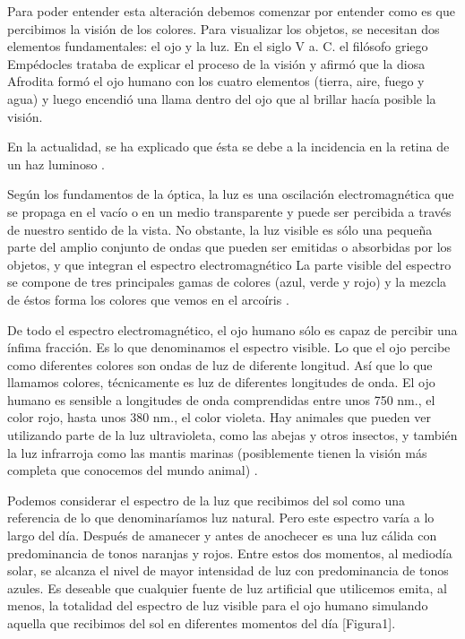 \documentclass[10pt]{article}
\begin{document}
\setlength{\parskip}{2mm}

Para poder entender esta alteración debemos comenzar por entender como es que percibimos la visión de los colores.
Para visualizar los objetos, se necesitan dos elementos fundamentales: el ojo y la luz. En el siglo V a. C. el filósofo griego Empédocles trataba de explicar el proceso de la visión y afirmó que la diosa Afrodita formó el ojo humano con los cuatro elementos (tierra, aire, fuego y agua) y luego encendió una llama dentro del ojo que al brillar hacía posible la visión.

\setlength{\parskip}{2mm}

En la actualidad, se ha explicado que ésta se debe a la incidencia en la retina de un haz luminoso \cite{IEEEreferencias:Ref13}.

\setlength{\parskip}{2mm}

Según los fundamentos de la óptica, la luz es una oscilación electromagnética que se propaga en el vacío o en un medio transparente y puede ser percibida a través de nuestro sentido de la vista. No obstante, la luz visible es sólo una pequeña parte del amplio conjunto de ondas que pueden ser emitidas o absorbidas por los objetos, y que integran el espectro electromagnético La parte visible del espectro se compone de tres principales gamas de colores (azul, verde y rojo) y la mezcla de éstos forma los colores que vemos en el arcoíris \cite{IEEEreferencias:Ref12}.

\setlength{\parskip}{2mm}

De todo el espectro electromagnético, el ojo humano sólo es capaz de percibir una ínfima fracción. Es lo que denominamos el espectro visible. Lo que el ojo percibe como diferentes colores son ondas de luz de diferente longitud. Así que lo que llamamos colores, técnicamente es luz de diferentes longitudes de onda. El ojo humano es sensible a longitudes de onda comprendidas entre unos 750 nm., el color rojo, hasta unos 380 nm., el color violeta. Hay animales que pueden ver utilizando parte de la luz ultravioleta, como las abejas y otros insectos, y también la luz infrarroja como las mantis marinas (posiblemente tienen la visión más completa que conocemos del mundo animal) \cite{IEEEreferencias:Ref13}.

\setlength{\parskip}{2mm}

Podemos considerar el espectro de la luz que recibimos del sol como una referencia de lo que denominaríamos luz natural. Pero este espectro varía a lo largo del día. Después de amanecer y antes de anochecer es una luz cálida con predominancia de tonos naranjas y rojos. Entre estos dos momentos, al mediodía solar, se alcanza el nivel de mayor intensidad de luz con predominancia de tonos azules. Es deseable que cualquier fuente de luz artificial que utilicemos emita, al menos, la totalidad del espectro de luz visible para el ojo humano simulando aquella que recibimos del sol en diferentes momentos del día \cite{IEEEreferencias:Ref13} [Figura1]. 
\end{document}
